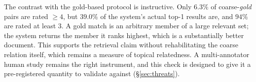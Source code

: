 The contrast with the gold-based protocol is instructive. Only $6.3\%$ of
coarse-\emph{gold} pairs are rated $\ge4$, but $39.0\%$ of the system's actual
top-1 results are, and $94\%$ are rated at least $3$. A gold match is an
arbitrary member of a large relevant set; the system returns the member it ranks
highest, which is a substantially better document. This supports the retrieval
claim without rehabilitating the coarse relation itself, which remains a measure
of topical relatedness. A multi-annotator human study remains the right
instrument, and this check is designed to give it a pre-registered quantity to
validate against (\S\ref{sec:threats}).
